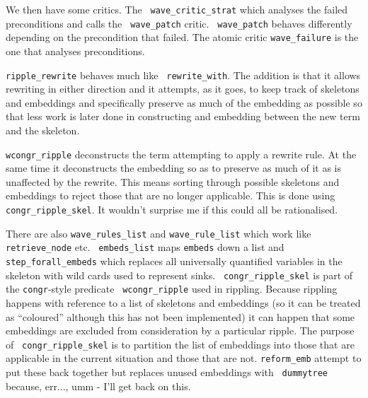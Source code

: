 \begin{description}
  
  We then have some critics.  The {\tt
    wave\_critic\_strat} which analyses the
  failed preconditions and calls the {\tt
    wave\_patch} critic.  {\tt
    wave\_patch} behaves differently depending on
  the precondition that failed.  The atomic
  critic {\tt wave\_failure}
  is the one that analyses preconditions.
  
  {\tt ripple\_rewrite} behaves much like {\tt
    rewrite\_with}.  The addition is that it
  allows rewriting in either direction and it attempts, as it goes, to
  keep track of skeletons and
  embeddings and specifically
  preserve as much of the embedding as possible so that less work is
  later done in constructing and embedding between the new term and
  the skeleton.
  
  {\tt wcongr\_ripple} deconstructs the term
  attempting to apply a rewrite rule.  At the same time it
  deconstructs the embedding so as to preserve as much of it as is
  unaffected by the rewrite.  This means sorting through possible
  skeletons and embeddings to reject
  those that are no longer applicable.  This is done using {\tt
    congr\_ripple\_skel}.  It wouldn't
  surprise me if this could all be rationalised.
  
  There are also {\tt wave\_rules\_list} and
  {\tt wave\_rule\_list} which work like {\tt
    retrieve\_node} etc.  {\tt
    embeds\_list} maps {\tt embeds}
  down a list and {\tt
    step\_forall\_embeds} which replaces
  all universally quantified variables in the skeleton
  with wild cards used to represent
  sinks.  {\tt
    congr\_ripple\_skel} is part of the
  {\tt congr}-style predicate {\tt
    wcongr\_ripple} used in rippling.  Because
  rippling happens with reference to a list of skeletons and
  embeddings (so it can be treated as
  ``coloured'' although this has not been
  implemented) it can happen that some embeddings are excluded from
  consideration by a particular ripple.  The purpose of {\tt
    congr\_ripple\_skel} is to partition the list of embeddings into
  those that are applicable in the current situation and those that
  are not. {\tt reform\_emb} attempt to put these
  back together but replaces unused embeddings with {\tt
    dummytree} because, err..., umm - I'll get back
  on this.
  

\end{description}
